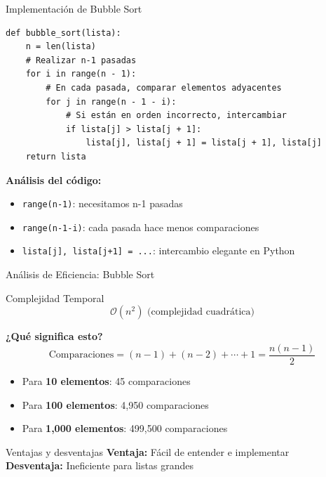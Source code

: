 \documentclass[10pt]{beamer}
\begin{document}
\begin{frame}[fragile]{Implementación de Bubble Sort}
\begin{verbatim}
def bubble_sort(lista):
    n = len(lista)
    # Realizar n-1 pasadas
    for i in range(n - 1):
        # En cada pasada, comparar elementos adyacentes
        for j in range(n - 1 - i):
            # Si están en orden incorrecto, intercambiar
            if lista[j] > lista[j + 1]:
                lista[j], lista[j + 1] = lista[j + 1], lista[j]
    return lista
\end{verbatim}

\vspace{0.3cm}
\textbf{Análisis del código:}
\begin{itemize}
  \item \texttt{range(n-1)}: necesitamos n-1 pasadas
  \item \texttt{range(n-1-i)}: cada pasada hace menos comparaciones
  \item \texttt{lista[j], lista[j+1] = ...}: intercambio elegante en Python
\end{itemize}
\end{frame}

\begin{frame}{Análisis de Eficiencia: Bubble Sort}
  \begin{block}{Complejidad Temporal}
    \[
    \mathcal{O}(n^2) \text{ (complejidad cuadrática)}
    \]
  \end{block}
  
	  \vspace{0.3cm}
	  \textbf{¿Qué significa esto?}
	  \[
	    \text{Comparaciones} =
	    (n-1) + (n-2) + \cdots + 1 =
	    \frac{n(n-1)}{2}
	  \]
	  \begin{itemize}
	    \item Para \textbf{10 elementos}: 45 comparaciones
	    \item Para \textbf{100 elementos}: 4,950 comparaciones
	    \item Para \textbf{1,000 elementos}: 499,500 comparaciones
	  \end{itemize}
  
  \vspace{0.3cm}
  \begin{alertblock}{Ventajas y desventajas}
    \textbf{Ventaja:} Fácil de entender e implementar\\
    \textbf{Desventaja:} Ineficiente para listas grandes
  \end{alertblock}
\end{frame}
\end{document}
